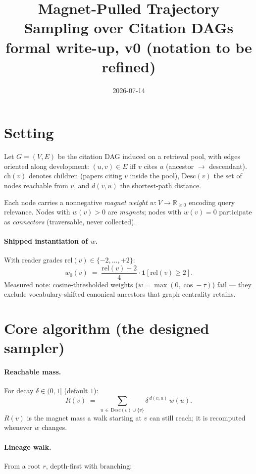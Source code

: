 \documentclass[11pt]{article}
\title{Magnet-Pulled Trajectory Sampling over Citation DAGs\\
\large formal write-up, v0 (notation to be refined)}
\author{}
\date{2026-07-14}
\newcommand{\Desc}{\mathrm{Desc}}
\newcommand{\ch}{\mathrm{ch}}
\begin{document}
\maketitle

\section{Setting}

Let $G=(V,E)$ be the citation DAG induced on a retrieval pool, with edges oriented
along development: $(u,v)\in E$ iff $v$ cites $u$ (ancestor $\to$ descendant).
$\ch(v)$ denotes children (papers citing $v$ inside the pool), $\Desc(v)$ the set of
nodes reachable from $v$, and $d(v,u)$ the shortest-path distance.

Each node carries a nonnegative \emph{magnet weight} $w:V\to\mathbb{R}_{\ge 0}$
encoding query relevance. Nodes with $w(v)>0$ are \emph{magnets}; nodes with
$w(v)=0$ participate as \emph{connectors} (traversable, never collected).

\paragraph{Shipped instantiation of $w$.} With reader grades
$\mathrm{rel}(v)\in\{-2,\dots,+2\}$:
\[
  w_0(v) \;=\; \frac{\mathrm{rel}(v)+2}{4}\cdot
  \mathbf{1}\!\left[\mathrm{rel}(v)\ge 2\right].
\]
Measured note: cosine-thresholded weights ($w=\max(0,\cos-\tau)$) fail — they exclude
vocabulary-shifted canonical ancestors that graph centrality retains.

\section{Core algorithm (the designed sampler)}

\paragraph{Reachable mass.} For decay $\delta\in(0,1]$ (default $1$):
\[
  R(v) \;=\; \sum_{u\,\in\,\Desc(v)\cup\{v\}} \delta^{\,d(v,u)}\, w(u).
\]
$R(v)$ is the magnet mass a walk starting at $v$ can still reach; it is recomputed
whenever $w$ changes.

\paragraph{Lineage walk.} From a root $r$, depth-first with branching:
\end{document}
